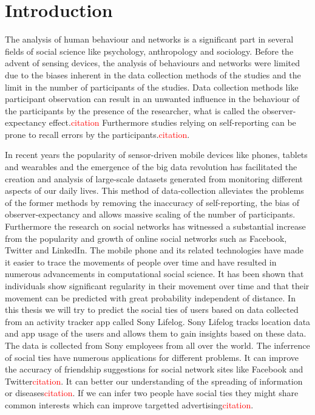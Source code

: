 \chapter{Introduction}
The analysis of human behaviour and networks is a significant part in several fields of social science like psychology, anthropology and sociology. Before the advent of sensing devices, the analysis of behaviours and networks were limited due to the biases inherent in the data collection methods of the studies and the limit in the number of participants of the studies. Data collection methods like participant observation can result in an unwanted influence in the behaviour of the participants by the presence of the researcher, what is called the observer-expectancy effect.\textcolor{red}{citation} Furthermore studies relying on self-reporting can be prone to recall errors by the participants.\textcolor{red}{citation}.

In recent years the popularity of sensor-driven mobile devices like phones, tablets and wearables and the emergence of the big data revolution has facilitated the creation and analysis of large-scale datasets generated from monitoring different aspects of our daily lives\cite{lazer2009life}. This method of data-collection alleviates the problems of the former methods by removing the inaccuracy of self-reporting, the bias of observer-expectancy and allows massive scaling of the number of participants. Furthermore the research on social networks has witnessed a substantial increase from the popularity and growth of online social networks such as Facebook, Twitter and LinkedIn\cite{social_networks}. The mobile phone and its related technologies have made it easier to trace the movements of people over time and have resulted in numerous advancements in computational social science. It has been shown that individuals show significant regularity in their movement over time\cite{Uihmp} and that their movement can be predicted with great probability independent of distance\cite{LoPiHM}. In this thesis we will try to predict the social ties of users based on data collected from an activity tracker app called Sony Lifelog\cite{sonyLifeLog}. Sony Lifelog tracks location data and app usage of the users and allows them to gain insights based on these data. The data is collected from Sony employees from all over the world.
The inferrence of social ties have numerous applications for different problems. It can improve the accuracy of friendship suggestions for social network sites like Facebook and Twitter\textcolor{red}{citation}. It can better our understanding of the spreading of information or diseases\textcolor{red}{citation}. If we can infer two people have social ties they might share common interests which can improve targetted advertising\textcolor{red}{citation}.

